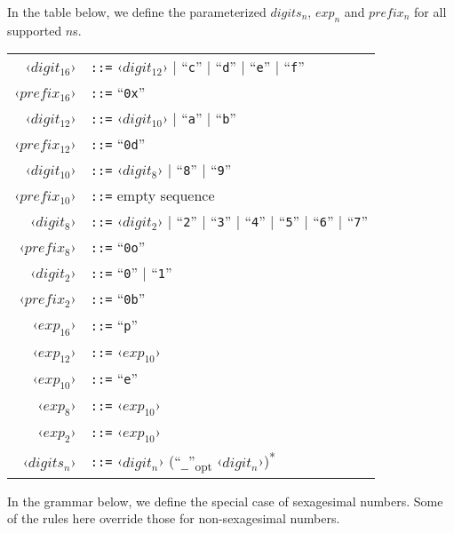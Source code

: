 In the table below, we define the parameterized $digits_n$, $exp_n$ and $prefix_n$ for all supported $n$s.

\grammar
\begin{longtable}{ r l }
  ‹$digit_{16}$› & \lstinline!::=! ‹$digit_{12}$› | ``\lstinline!c!'' | ``\lstinline!d!'' | ``\lstinline!e!'' | ``\lstinline!f!'' \\
  ‹$prefix_{16}$› & \lstinline!::=! ``\lstinline!0x!'' \\
  
  ‹$digit_{12}$› & \lstinline!::=! ‹$digit_{10}$› | ``\lstinline!a!'' | ``\lstinline!b!'' \\
  ‹$prefix_{12}$› & \lstinline!::=! ``\lstinline!0d!'' \\
  
  ‹$digit_{10}$› & \lstinline!::=! ‹$digit_8$› | ``\lstinline!8!'' | ``\lstinline!9!'' \\
  ‹$prefix_{10}$› & \lstinline!::=! empty sequence \\
  
  ‹$digit_8$› & \lstinline!::=! ‹$digit_2$› | ``\lstinline!2!'' | ``\lstinline!3!'' | ``\lstinline!4!'' | ``\lstinline!5!'' | ``\lstinline!6!'' | ``\lstinline!7!'' \\
  ‹$prefix_8$› & \lstinline!::=! ``\lstinline!0o!'' \\
  
  ‹$digit_2$› & \lstinline!::=! ``\lstinline!0!'' | ``\lstinline!1!'' \\
  ‹$prefix_2$› & \lstinline!::=! ``\lstinline!0b!'' \\
  
  ‹$exp_{16}$› & \lstinline!::=! ``\lstinline!p!'' \\
  ‹$exp_{12}$› & \lstinline!::=! ‹$exp_{10}$› \\
  ‹$exp_{10}$› & \lstinline!::=! ``\lstinline!e!'' \\
  ‹$exp_8$› & \lstinline!::=! ‹$exp_{10}$› \\
  ‹$exp_2$› & \lstinline!::=! ‹$exp_{10}$› \\
  
  ‹$digits_n$› & \lstinline!::=! ‹$digit_n$› (``\lstinline!_!''\textsubscript{opt} ‹$digit_n$›)\textsuperscript{*} \\
\end{longtable}

In the grammar below, we define the special case of sexagesimal numbers. Some of the rules here override those for non-sexagesimal numbers.

